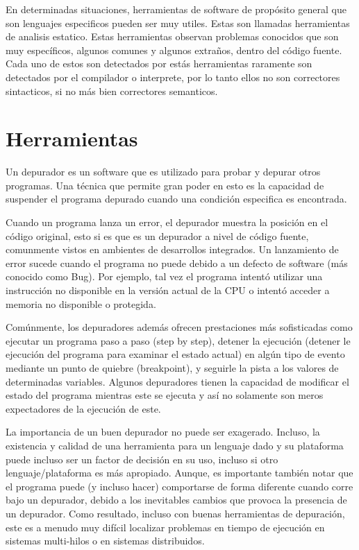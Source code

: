 \documentclass[12pt,legalpaper]{report}
\begin{document}
En determinadas situaciones, herramientas de software de propósito general que son lenguajes especificos pueden ser muy utiles.  Estas son llamadas herramientas de analisis estatico.  Estas herramientas observan problemas conocidos que son muy específicos, algunos comunes y algunos extraños, dentro del código fuente.  Cada uno de estos son detectados por estás herramientas raramente son detectados por el compilador o interprete, por lo tanto ellos no son correctores sintacticos, si no más bien correctores semanticos.


	\section{Herramientas}

Un depurador es un software que es utilizado para probar y depurar otros programas.  Una técnica que permite gran poder en esto es la capacidad de suspender el programa depurado cuando una condición especifica es encontrada.


Cuando un programa lanza un error, el depurador muestra la posición en el código original, esto si es que es un depurador a nivel de código fuente, comunmente vistos en ambientes de desarrollos integrados.  Un lanzamiento de error sucede cuando el programa no puede debido a un defecto de software (más conocido como Bug).  Por ejemplo, tal vez el programa intentó utilizar una instrucción no disponible en la versión actual de la CPU o intentó acceder a memoria no disponible o protegida.


Comúnmente, los depuradores además ofrecen prestaciones más sofisticadas como ejecutar un programa paso a paso (step by step), detener la ejecución (detener le ejecución del programa para examinar el estado actual) en algún tipo de evento mediante un punto de quiebre (breakpoint), y seguirle la pista a los valores de determinadas variables.  Algunos depuradores tienen la capacidad de modificar el estado del programa mientras este se ejecuta y así no solamente son meros expectadores de la ejecución de este.


La importancia de un buen depurador no puede ser exagerado.  Incluso, la existencia y calidad de una herramienta para un lenguaje dado y su plataforma puede incluso ser un factor de decisión en su uso, incluso si otro lenguaje/plataforma es más apropiado.  Aunque, es importante también notar que el programa puede (y incluso hacer) comportarse de forma diferente cuando corre bajo un depurador, debido a los inevitables cambios que provoca la presencia de un depurador.  Como resultado, incluso con buenas herramientas de depuración, este es a menudo muy difícil localizar problemas en tiempo de ejecución en sistemas multi-hilos o en sistemas distribuidos.
\end{document}
